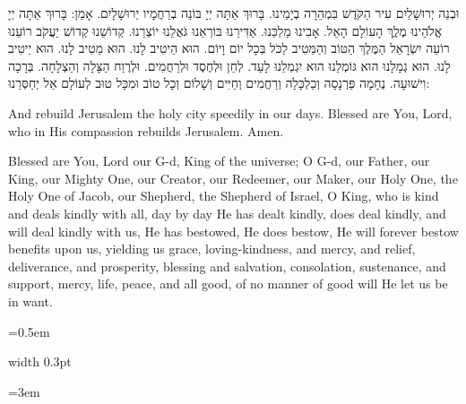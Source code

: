 \documentclass[11pt, openany]{book}
\newlength{\bidiHebWidth}
\newlength{\bidiEngWidth}
\newenvironment{bilingual}{%
  \par\vspace{4pt}%
}{%
  \noindent
  \begin{minipage}[t]{\bidiEngWidth}
    \setstretch{1.4}\emergencystretch=0.5em\normalsize
    \usebox{\bidiEngBox}
  \end{minipage}%
  \hfill
  {\color{sedergold}\vrule width 0.3pt}%
  \hfill
  \begin{minipage}[t]{\bidiHebWidth}
    \begingroup\hebrewfont\TeXXeTstate=1\beginR
    \large\setstretch{1.4}\emergencystretch=3em\tolerance=9999\parindent=0pt\relax
    \usebox{\bidiHebBox}
    \endR\endgroup
  \end{minipage}%
  \par\vspace{2pt}%
}
\newenvironment{hebrewcol}{%
  \begin{lrbox}{\bidiHebBox}\begin{minipage}{\bidiHebWidth}%
}{%
  \end{minipage}\end{lrbox}%
}
\newenvironment{englishcol}{%
  \begin{lrbox}{\bidiEngBox}\begin{minipage}{\bidiEngWidth}%
}{%
  \end{minipage}\end{lrbox}%
}
\begin{document}
\begin{bilingual}
\begin{hebrewcol}
וּבְנֵה יְרוּשָׁלַיִם עִיר הַקֹּדֶשׁ בִּמְהֵרָה בְיָמֵינוּ. בָּרוּךְ אַתָּה יְיָ בּוֹנֵה בְרַחֲמָיו יְרוּשָׁלָיִם. אָמֵן:
בָּרוּךְ אַתָּה יְיָ אֱלֹהֵינוּ מֶלֶֶךְ הָעוֹלָם הָאֵל. אָבִינוּ מַלְכֵּנוּ. אַדִּירֵנוּ בּוֹרְאֵנוּ גֹּאֲלֵנוּ יוֹצְרֵנוּ. קְדוֹשֵׁנוּ קְדוֹשׁ יַעֲקֹב רוֹעֵנוּ רוֹעֵה יִשְׂרָאֵל הַמֶּלֶךְ הַטּוֹב וְהַמֵּטִיב לַכֹּל בְּכָל יוֹם וָיוֹם. הוּא הֵיטִיב לָנוּ. הוּא מֵטִיב לָנוּ. הוּא יֵיטִיב לָנוּ. הוּא גְמָלָנוּ הוּא גּוֹמְלֵנוּ הוּא יִגְמְלֵנוּ לָעַד. לְחֵן וּלְחֶסֶד וּלְרַחֲמִים. וּלְרֶוַח הַצָּלָה וְהַצְלָחָה. בְּרָכָה וִישׁוּעָה. נֶחָמָה פַּרְנָסָה וְכַלְכָּלָה וְרַחֲמִים וְחַיִּים וְשָׁלוֹם וְכָל טוֹב וּמִכָּל טוּב לְעוֹלָם אַל יְחַסְּרֵנוּ:
\end{hebrewcol}
\begin{englishcol}
And rebuild Jerusalem the holy city speedily in our days. Blessed are You, Lord, who in His compassion rebuilds Jerusalem. Amen.

Blessed are You, Lord our G-d, King of the universe; O G-d, our Father, our King, our Mighty One, our Creator, our Redeemer, our Maker, our Holy One, the Holy One of Jacob, our Shepherd, the Shepherd of Israel, O King, who is kind and deals kindly with all, day by day He has dealt kindly, does deal kindly, and will deal kindly with us, He has bestowed, He does bestow, He will forever bestow benefits upon us, yielding us grace, loving-kindness, and mercy, and relief, deliverance, and prosperity, blessing and salvation, consolation, sustenance, and support, mercy, life, peace, and all good, of no manner of good will He let us be in want.
\end{englishcol}
\end{bilingual}
\end{document}
